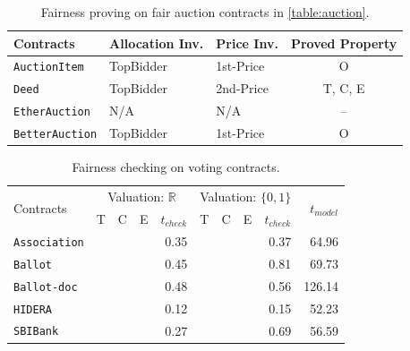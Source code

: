 \begin{table}[t]
	\centering
	\caption{Fairness proving on fair auction contracts in \cref{table:auction}.}
	\label{table:proof}
	\small
	\begin{tabular}{lllc}
		\toprule
		\multirow{1}{*}{Contracts} & Allocation Inv. & Price Inv. & Proved Property \\
		\midrule
		\multirow{1}{*}{\texttt{AuctionItem}}  & TopBidder & 1st-Price & O \\
		\multirow{1}{*}{\texttt{Deed}}   &  TopBidder & 2nd-Price  & T, C, E \\
		\multirow{1}{*}{\texttt{EtherAuction}}  & N/A & N/A & -- \\
		\multirow{1}{*}{\texttt{BetterAuction}}  & TopBidder& 1st-Price & O \\
		\bottomrule
	\end{tabular}
\end{table}

\begin{table}[t]
	\centering
	\caption{Fairness checking on voting contracts.}\label{table:voting}
	\small
	\begin{tabular}{lcccr|cccr|r}
		\toprule
		\multirow{2}{.5in}{Contracts} & \multicolumn{4}{c|}{Valuation: $\mathbb{R}$ } & \multicolumn{4}{c|}{Valuation: $\{0,1\}$} &
		\multirow{2}{.3in}{$t_{model}$}\\
		\cmidrule{2-9}
		& T & C & E & $t_{check}$ & T & C & E & $t_{check}$ & \\
		\midrule
		\texttt{Association} &\xmark  &\xmark &\xmark &  0.35  &\cmark  &\cmark &\cmark &0.37 &64.96\\
		\texttt{Ballot}      &\xmark  &\xmark &\xmark &  0.45  &\cmark  &\cmark &\cmark &0.81 &69.73\\
		\texttt{Ballot-doc}  &\xmark  &\xmark &\xmark &  0.48  &\cmark  &\cmark &\cmark &0.56 &126.14    \\
		\texttt{HIDERA}     &\xmark  &\xmark &\xmark &  0.12  &\cmark  &\cmark &\cmark &0.15 &52.23     \\
		\texttt{SBIBank}     &\xmark  &\xmark &\xmark &  0.27  &\cmark  &\cmark &\cmark &0.69 &56.59   \\
		\bottomrule
	\end{tabular}
\end{table}

